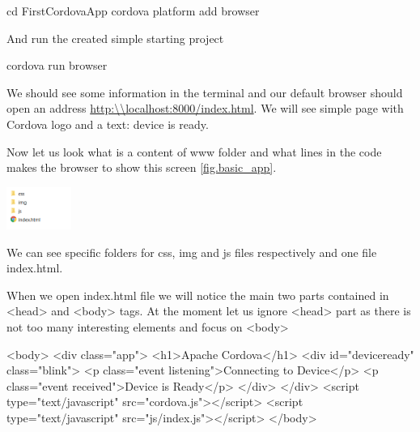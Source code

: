 \begin{shell}
cd FirstCordovaApp
cordova platform add browser
\end{shell}

And run the created simple starting project

\begin{shell}
cordova run browser
\end{shell}

We should see some information in the terminal and our default browser should open an address \url{http:\\localhost:8000/index.html}. We will see simple page with Cordova logo and a text: device is ready.

Now let us look what is a content of www folder and what lines in the code makes the browser to show this screen \ref{fig.basic_app}.

\includegraphics[width=60pt]{chapters/img/basic_structure.png}

We can see specific folders for css, img and js files respectively and one file index.html.

When we open index.html file we will notice the main two parts contained in <head> and <body> tags. At the moment let us ignore <head> part as there is not too many interesting elements and focus on <body>

\begin{html}
<body>
        <div class="app">
            <h1>Apache Cordova</h1>
            <div id="deviceready" class="blink">
                <p class="event listening">Connecting to Device</p>
                <p class="event received">Device is Ready</p>
            </div>
        </div>
        <script type="text/javascript" src="cordova.js"></script>
        <script type="text/javascript" src="js/index.js"></script>
</body>
\end{html}

